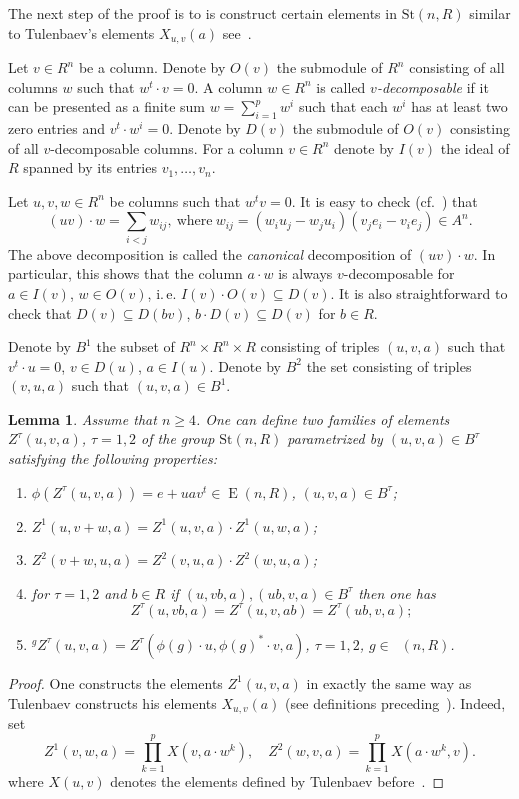 \documentclass[oneside,12pt]{amsart}
\numberwithin{equation}{section}
\newtheorem{lem}{Lemma}
\numberwithin{lem}{section}
\theoremstyle{definition}
\theoremstyle{remark}
\DeclareMathOperator{\St}{St^G}
\DeclareMathOperator{\EE}{E}
\newcommand{\Stb}{\mathrm{St}}
\begin{document}
\begin{appendices}
The next step of the proof is to is construct certain elements in $\Stb(n, R)$ similar to Tulenbaev's elements $X_{u,v}(a)$ see~\cite[\S~1]{Tu}.

Let $v\in R^n$ be a column.
Denote by $O(v)$ the submodule of $R^n$ consisting of all columns $w$ such that $w^t \cdot v = 0$.
A column $w\in R^n$ is called \emph{$v$-decomposable} if it can be presented as a finite sum $w = \sum\limits_{i=1}^p w^i$ such that each $w^i$ has at least two zero entries and $v^t \cdot w^i = 0$.
Denote by $D(v)$ the submodule of $O(v)$ consisting of all $v$-decomposable columns.
For a column $v\in R^n$ denote by $I(v)$ the ideal of $R$ spanned by its entries $v_1,\ldots, v_n$.

Let $u,v,w\in R^n$ be columns such that $w^tv=0$.
It is easy to check (cf.~\cite[Lemma~3.2]{Ka}) that
$$(uv)\cdot w = \sum_{i<j}w_{ij},\ \text{where}\ w_{ij} = (w_iu_j - w_ju_i)(v_je_i - v_ie_j)\in{}\!A^n.$$
The above decomposition is called the \emph{canonical} decomposition of $(uv)\cdot w$.
In particular, this shows that the column $a\cdot w$ is always $v$-decomposable for $a\in I(v)$, $w \in O(v)$, i.\,e. $I(v) \cdot O(v) \subseteq D(v)$.
It is also straightforward to check that $D(v)\subseteq D(bv)$, $b \cdot D(v) \subseteq D(v)$ for $b \in R$.

Denote by $B^1$ the subset of $R^n \times R^n \times R$ consisting of triples $(u, v, a)$ such that $v^t \cdot u = 0$, $v \in D(u)$, $a \in I(u)$.
Denote by $B^2$ the set consisting of triples $(v, u, a)$ such that $(u, v, a) \in B^1$.

\begin{lem} \label{lem:Zfacts}
Assume that $n \geq 4$.
One can define two families of elements $Z^\tau(u, v, a)$, $\tau=1,2$ of the group $\Stb(n, R)$ parametrized by $(u, v, a) \in B^\tau$ satisfying the following properties:
 \begin{enumerate}
  \item $\phi(Z^\tau(u, v, a)) = e + uav^t \in \EE(n, R)$, $(u,v,a) \in B^\tau$;
  \item $Z^{1}(u, v + w, a) = Z^{1}(u, v, a) \cdot Z^{1}(u, w, a)$;
  \item $Z^{2}(v + w, u, a) = Z^{2}(v, u, a) \cdot Z^{2}(w, u, a)$;
  \item for $\tau=1,2$ and $b \in R$ if $(u,vb,a), (ub, v, a) \in B^\tau$ then one has
   $$Z^\tau(u,vb, a) = Z^\tau(u, v, ab) = Z^\tau (ub, v, a);	$$
  \item ${}^{g}\! Z^{\tau}(u, v, a) = Z^{\tau}(\phi(g) \cdot u, \phi(g)^* \cdot v, a)$, $\tau = 1,2$, $g \in \St(n, R)$.
 \end{enumerate}
\end{lem}
\begin{proof}
One constructs the elements $Z^1(u,v,a)$ in exactly the same way as Tulenbaev constructs his elements $X_{u,v}(a)$ (see definitions preceding~\cite[Lemma~1.2]{Tu}).
Indeed, set \begin{equation} Z^1(v, w, a) = \prod\limits_{k=1}^p X(v, a \cdot w^k), \quad Z^2(w, v, a) = \prod\limits_{k=1}^p X(a \cdot w^k, v). \end{equation}
where $X(u, v)$ denotes the elements defined by Tulenbaev before~\cite[Lemma~1.1]{Tu}.


\end{proof}
\end{appendices}
\end{document}
